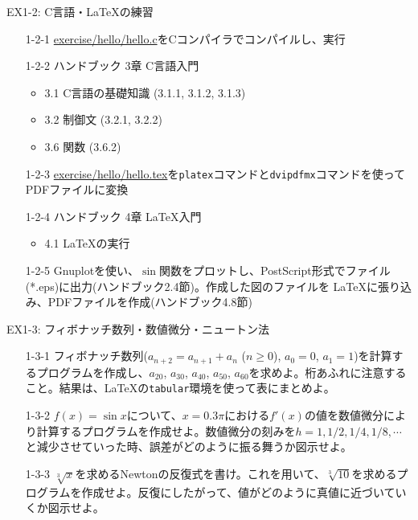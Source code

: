 \documentclass[dvipdfmx]{beamer}
\begin{document}
\begin{frame}[t,fragile]{EX1-2: C言語・\LaTeX の練習}
  \begin{itemize}
  \item[1-2-1] \href{https://github.com/todo-group/computer-experiments/exercise/hello/hello.c}{exercise/hello/hello.c}をCコンパイラでコンパイルし、実行
  \item[1-2-2] ハンドブック 3章 C言語入門
    \begin{itemize}
    \item 3.1 C言語の基礎知識 (3.1.1, 3.1.2, 3.1.3)
    \item 3.2 制御文 (3.2.1, 3.2.2)
    \item 3.6 関数 (3.6.2)
    \end{itemize}
  \item[1-2-3] \href{https://github.com/todo-group/computer-experiments/exercise/hello/hello.tex}{exercise/hello/hello.tex}を{\tt platex}コマンドと{\tt dvipdfmx}コマンドを使ってPDFファイルに変換
  \item[1-2-4] ハンドブック 4章 \LaTeX 入門
    \begin{itemize}
    \item 4.1 \LaTeX の実行
    \end{itemize}
  \item[1-2-5] Gnuplotを使い、$\sin$関数をプロットし、PostScript形式でファイル(*.eps)に出力(ハンドブック2.4節)。作成した図のファイルを \LaTeX に張り込み、PDFファイルを作成(ハンドブック4.8節)
  \end{itemize}
\end{frame}

\begin{frame}[t,fragile]{EX1-3: フィボナッチ数列・数値微分・ニュートン法}
  \begin{itemize}
    \setlength{\itemsep}{1em}
  \item[1-3-1] フィボナッチ数列($a_{n+2}=a_{n+1}+a_n$ ($n \ge 0$), $a_0=0$, $a_1=1$)を計算するプログラムを作成し、$a_{20}$, $a_{30}$, $a_{40}$, $a_{50}$, $a_{60}$を求めよ。桁あふれに注意すること。結果は、\LaTeX の{\tt tabular}環境を使って表にまとめよ。
  \item[1-3-2] $f(x)=\sin x$について、$x=0.3\pi$における$f'(x)$の値を数値微分により計算するプログラムを作成せよ。数値微分の刻みを$h=1,1/2,1/4,1/8,\cdots$と減少させていった時、誤差がどのように振る舞うか図示せよ。
  \item[1-3-3] $\sqrt[3]{x}$を求めるNewtonの反復式を書け。これを用いて、$\sqrt[3]{10}$を求めるプログラムを作成せよ。反復にしたがって、値がどのように真値に近づいていくか図示せよ。
  \end{itemize}    
\end{frame}
\end{document}

